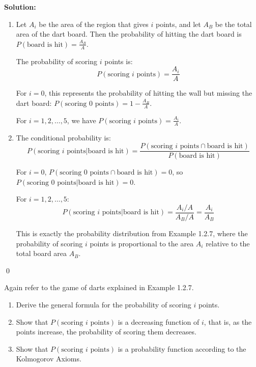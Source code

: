 \noindent\textbf{Solution:}
\begin{enumerate}[label=(\alph*)]
    \item Let $A_i$ be the area of the region that gives $i$ points, and let $A_B$ be the total area of the dart board. Then the probability of hitting the dart board is $P(\text{board is hit}) = \frac{A_B}{A}$.
    
    The probability of scoring $i$ points is:
    \[ P(\text{scoring } i \text{ points}) = \frac{A_i}{A} \]
    
    For $i = 0$, this represents the probability of hitting the wall but missing the dart board: $P(\text{scoring } 0 \text{ points}) = 1 - \frac{A_B}{A}$.
    
    For $i = 1, 2, \ldots, 5$, we have $P(\text{scoring } i \text{ points}) = \frac{A_i}{A}$.
    
    \item The conditional probability is:
    \[ P(\text{scoring } i \text{ points}|\text{board is hit}) = \frac{P(\text{scoring } i \text{ points} \cap \text{board is hit})}{P(\text{board is hit})} \]
    
    For $i = 0$, $P(\text{scoring } 0 \text{ points} \cap \text{board is hit}) = 0$, so $P(\text{scoring } 0 \text{ points}|\text{board is hit}) = 0$.
    
    For $i = 1, 2, \ldots, 5$:
    \[ P(\text{scoring } i \text{ points}|\text{board is hit}) = \frac{A_i/A}{A_B/A} = \frac{A_i}{A_B} \]
    
    This is exactly the probability distribution from Example 1.2.7, where the probability of scoring $i$ points is proportional to the area $A_i$ relative to the total board area $A_B$.
\end{enumerate}



\qed
\begin{problembox}
Again refer to the game of darts explained in Example 1.2.7.
\begin{enumerate}[label=(\alph*)]
    \item Derive the general formula for the probability of scoring $i$ points.
    \item Show that $P(\text{scoring } i \text{ points})$ is a decreasing function of $i$, that is, as the points increase, the probability of scoring them decreases.
    \item Show that $P(\text{scoring } i \text{ points})$ is a probability function according to the Kolmogorov Axioms.
\end{enumerate}
\end{problembox}

